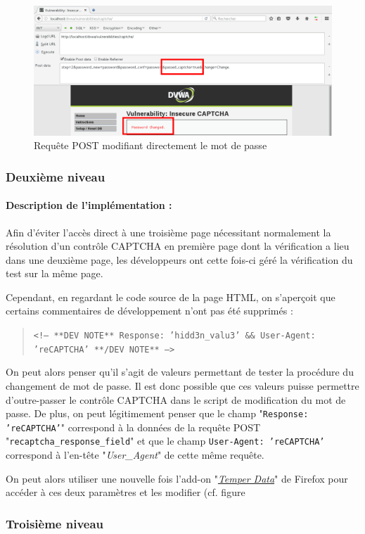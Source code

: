 \begin{figure}[!h]
\begin{center}

\includegraphics[scale=0.4]{images/captcha4.png}

\caption{Requête POST modifiant directement le mot de passe}
\label{captcha4}
\end{center}
\end{figure}

\subsubsection{Deuxième niveau}

\paragraph{Description de l'implémentation :}

Afin d'éviter l'accès direct à une troisième page nécessitant normalement la résolution d'un contrôle CAPTCHA en première page dont la vérification a lieu dans une deuxième page, les développeurs ont cette fois-ci géré la vérification du test sur la même page.

Cependant, en regardant le code source de la page HTML, on s'aperçoit que certains commentaires de développement n'ont pas été supprimés : 

\begin{quote}
\texttt{<!-- **DEV NOTE**   Response: 'hidd3n\_valu3'   \&\&   User-Agent: 'reCAPTCHA'   **/DEV NOTE** -->}
\end{quote}

On peut alors penser qu'il s'agit de valeurs permettant de tester la procédure du changement de mot de passe. Il est donc possible que ces valeurs puisse permettre d'outre-passer le contrôle CAPTCHA dans le script de modification du mot de passe. De plus, on peut légitimement penser que le champ "\texttt{Response: 'reCAPTCHA'}" correspond à la données de la requête POST "\texttt{recaptcha\_response\_field}" et que le champ \texttt{User-Agent: 'reCAPTCHA'} correspond à l'en-tête "\textit{User\_Agent}" de cette même requête.

On peut alors utiliser une nouvelle fois l'add-on "\href{https://addons.mozilla.org/fr/firefox/addon/tamper-data/}{\textit{Temper Data}}" de Firefox pour accéder à ces deux paramètres et les modifier (cf. figure


\subsubsection{Troisième niveau}








\clearpage